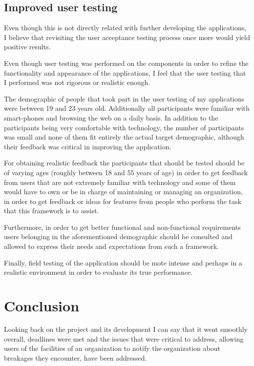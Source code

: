 \documentclass[12pt]{ecsproject}     %
\begin{document}
\subsection{Improved user testing}
Even though this is not directly related with further developing the applications, I believe that revisiting the user acceptance testing process once more would yield positive results. 

Even though user testing was performed on the components in order to refine the functionality and appearance of the applications, I feel that the user testing that I performed was not rigorous or realistic enough.

The demographic of people that took part in the user testing of my applications were between 19 and 23 years old. Additionally all participants were familiar with smart-phones and browsing the web on a daily basis. In addition to the participants being very comfortable with technology, the number of participants was small and none of them fit entirely the actual target demographic, although their feedback was critical in improving the application.

For obtaining realistic feedback the participants that should be tested should be of varying ages (roughly between 18 and 55 years of age) in order to get feedback from users that are not extremely familiar with technology and some of them would have to own or be in charge of maintaining or managing an organization, in order to get feedback or ideas for features from people who perform the task that this framework is to assist.

Furthermore, in order to get better functional and non-functional requirements users belonging in the aforementioned demographic should be consulted and allowed to express their needs and expectations from such a framework. 

Finally, field testing of the application should be mote intense and perhaps in a realistic environment in order to evaluate its true performance.

\section{Conclusion}
Looking back on the project and its development I can say that it went smoothly overall, deadlines were met and the issues that were critical to address, allowing users of the facilities of an organization to notify the organization about breakages they encounter, have been addressed.
\end{document}
